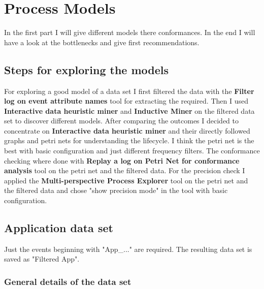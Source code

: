 \section{Process Models}
In the first part I will give different models there conformances. In the end I will have a look at the bottlenecks and give first recommendations.

\subsection{Steps for exploring the models}

For exploring a good model of a data set I first filtered the data with the \textbf{Filter log on event attribute names} tool for extracting the required. Then I used \textbf{Interactive data heuristic miner} and \textbf{Inductive Miner} on the filtered data set to discover different models. After comparing the outcomes I decided to concentrate on \textbf{Interactive data heuristic miner} and their directly followed graphs and petri nets for understanding the lifecycle. I think the petri net is the best with basic configuration and just different frequency filters. The conformance checking where done with \textbf{Replay a log on Petri Net for conformance analysis} tool on the petri net and the filtered data. For the precision check I applied the \textbf{Multi-perspective Process Explorer} tool on the petri net and the filtered data and chose "show precision mode" in the tool with basic configuration.

\subsection{Application data set}
Just the events beginning with "App\_..." are required. The resulting data set is saved as "Filtered App".

\subsubsection{General details of the data set}

